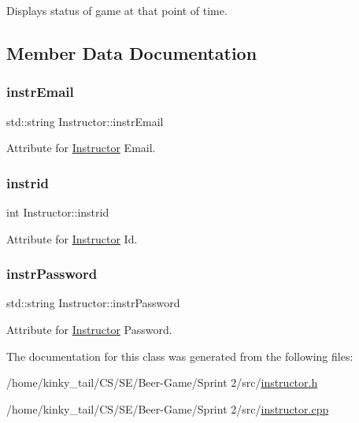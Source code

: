 Displays status of game at that point of time. 



\subsection{Member Data Documentation}
\mbox{\label{class_instructor_aa32f70770889ea70fd9e37b176b3d35a}} 
\subsubsection{\texorpdfstring{instr\+Email}{instrEmail}}
{\footnotesize\ttfamily std\+::string Instructor\+::instr\+Email\hspace{0.3cm}{\ttfamily [private]}}



Attribute for \hyperlink{class_instructor}{Instructor} Email. 

\mbox{\label{class_instructor_a4dde1d72f984b0530250cde154c66d96}} 
\subsubsection{\texorpdfstring{instrid}{instrid}}
{\footnotesize\ttfamily int Instructor\+::instrid\hspace{0.3cm}{\ttfamily [private]}}



Attribute for \hyperlink{class_instructor}{Instructor} Id. 

\mbox{\label{class_instructor_aa2550f7fbea278158c928f86c7fc420f}} 
\subsubsection{\texorpdfstring{instr\+Password}{instrPassword}}
{\footnotesize\ttfamily std\+::string Instructor\+::instr\+Password\hspace{0.3cm}{\ttfamily [private]}}



Attribute for \hyperlink{class_instructor}{Instructor} Password. 



The documentation for this class was generated from the following files\+:\begin{DoxyCompactItemize}
\item 
/home/kinky\+\_\+tail/\+C\+S/\+S\+E/\+Beer-\/\+Game/\+Sprint 2/src/\hyperlink{instructor_8h}{instructor.\+h}\item 
/home/kinky\+\_\+tail/\+C\+S/\+S\+E/\+Beer-\/\+Game/\+Sprint 2/src/\hyperlink{instructor_8cpp}{instructor.\+cpp}\end{DoxyCompactItemize}
